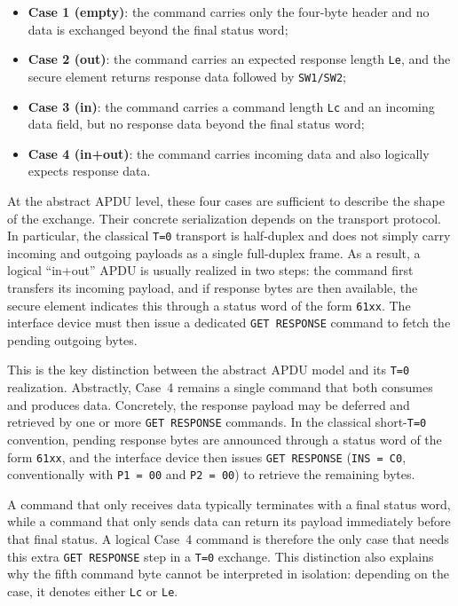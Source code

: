 \begin{itemize}
\item \textbf{Case 1 (empty)}: the command carries only the four-byte
  header and no data is exchanged beyond the final status word;
\item \textbf{Case 2 (out)}: the command carries an expected response
  length \texttt{Le}, and the secure element returns response data followed by
  \texttt{SW1/SW2};
\item \textbf{Case 3 (in)}: the command carries a command length
  \texttt{Lc} and an incoming data field, but no response data beyond
  the final status word;
\item \textbf{Case 4 (in+out)}: the command carries incoming data and
  also logically expects response data.
\end{itemize}

At the abstract APDU level, these four cases are sufficient to describe
the shape of the exchange. Their concrete serialization depends on the
transport protocol. In particular, the classical \texttt{T=0} transport
is half-duplex and does not simply carry incoming and outgoing payloads
as a single full-duplex frame. As a result, a logical ``in+out'' APDU is
usually realized in two steps: the command first transfers its incoming
payload, and if response bytes are then available, the secure element indicates
this through a status word of the form \texttt{61xx}. The interface
device must
then issue a dedicated \texttt{GET RESPONSE} command to fetch the
pending outgoing bytes.

This is the key distinction between the abstract APDU model and its
\texttt{T=0} realization. Abstractly, Case~4 remains a single command
that both consumes and produces data. Concretely, the response payload
may be deferred and retrieved by one or more \texttt{GET RESPONSE}
commands. In the classical short-\texttt{T=0} convention, pending
response bytes are announced through a status word of the form
\texttt{61xx}, and the interface device then issues \texttt{GET RESPONSE}
(\texttt{INS = C0}, conventionally with \texttt{P1 = 00} and
\texttt{P2 = 00}) to retrieve the remaining bytes.

A command that only receives data typically terminates with a final
status word, while a command that only sends data can return its payload
immediately before that final status. A logical Case~4 command is
therefore the only case that needs this extra \texttt{GET RESPONSE}
step in a \texttt{T=0} exchange. This distinction also explains why the
fifth command byte cannot be interpreted in isolation: depending on the
case, it denotes either \texttt{Lc} or \texttt{Le}.

